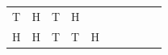 {\begin{tabular}[t]{|l|l|l|l|l|l|l|l|l|l|}
        T &
    
    
        H &
    
    
        T &
    
    
        H%
     \tabularnewline\cline{1-1}\cline{2-2}\cline{3-3}\cline{4-4}\cline{5-5}\cline{6-6}\cline{7-7}\cline{8-8}\cline{9-9}\cline{10-10}
    
    
        H &
    
    
        H &
    
    
        T &
    
    
        T &
    
    
        H &
    

\end{tabular}}
